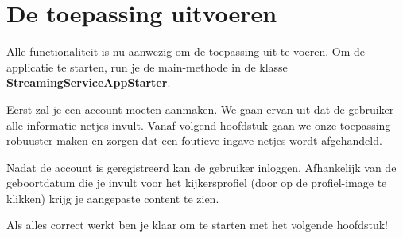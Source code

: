 \documentclass{tstextbook}
\begin{document}
\section{De toepassing uitvoeren}

Alle functionaliteit is nu aanwezig om de toepassing uit te voeren. 
Om de applicatie te starten, run je de main-methode in de klasse \textbf{StreamingServiceAppStarter}.

Eerst zal je een account moeten aanmaken. We gaan ervan uit dat de gebruiker alle informatie netjes invult. Vanaf volgend hoofdstuk gaan we onze toepassing robuuster maken en zorgen dat een foutieve ingave netjes wordt afgehandeld. 

Nadat de account is geregistreerd kan de gebruiker inloggen. Afhankelijk van de geboortdatum die je invult voor het kijkersprofiel (door op de profiel-image te klikken) krijg je aangepaste content te zien.

Als alles correct werkt ben je klaar om te starten met het volgende hoofdstuk!
\end{document}
